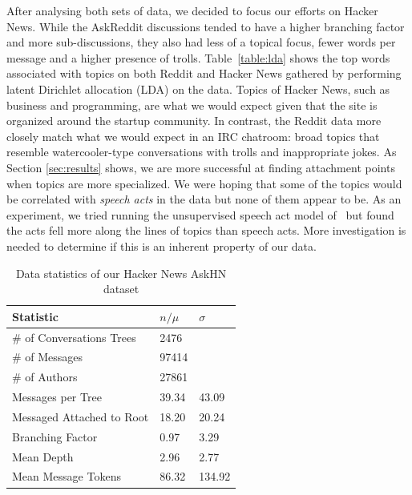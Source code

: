 \documentclass{article}
\begin{document}
After analysing both sets of data, we decided to focus our efforts on Hacker
News. While the AskReddit discussions tended to have a higher branching factor
and more sub-discussions, they also had less of a topical focus, fewer words
per message and a higher presence of trolls. Table~\ref{table:lda} shows the
top words associated with topics on both Reddit and Hacker News gathered by
performing latent Dirichlet allocation (LDA) \cite{Blei2003} on the data. Topics of Hacker
News, such as business and programming, are what we would expect given that
the site is organized around the startup community. In contrast, the Reddit
data more closely match what we would expect in an IRC chatroom: broad topics
that resemble watercooler-type conversations with trolls and inappropriate
jokes. As Section \ref{sec:results} shows, we are more successful at finding
attachment points when topics are more specialized. We were hoping that some
of the topics would be correlated with \textit{speech acts} in the data but
none of them appear to be. As an experiment, we tried running the unsupervised
speech act model of~ but found the acts fell more along the lines
of topics than speech acts. More investigation is needed to determine if this
is an inherent property of our data.


\begin{table}[ht]\footnotesize
 \centering
 \begin{tabular}{| l | l | l |} 
   \hline
   \textbf{Statistic} & \textbf{$n / \mu$} & \textbf{$\sigma$} \\
   \hline
   \# of Conversations Trees & 2476 & \\
   \# of Messages & 97414 & \\
   \# of Authors & 27861 & \\
   Messages per Tree & 39.34 & 43.09 \\
   Messaged Attached to Root &  18.20 & 20.24 \\
   Branching Factor & 0.97 & 3.29 \\
   Mean Depth & 2.96 & 2.77 \\
   Mean Message Tokens & 86.32 & 134.92 \\
   \hline
  \end{tabular}
  \caption{Data statistics of our Hacker News AskHN dataset}
  \label{table:stats}
\end{table}
\end{document}
